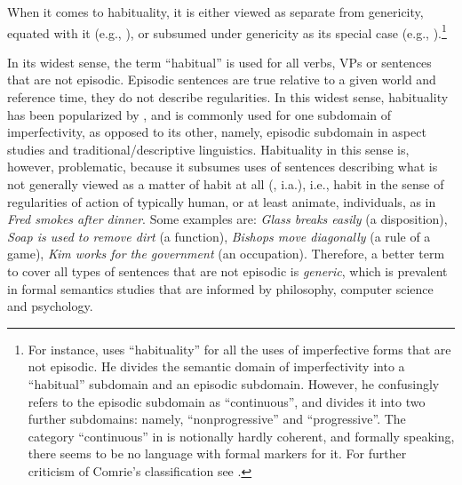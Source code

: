 \documentclass[output=paper,colorlinks,citecolor=brown]{langscibook}
\begin{document}
When it comes to habituality, it
is either viewed as separate from genericity, equated with it (e.g., \citealt{Comrie1976}), or subsumed under genericity as its special case (e.g., \citealt{krifka1995genericity}).\footnote{For instance, \citet{Comrie1976}
uses ``habituality'' for 
all the uses of imperfective forms that are not episodic.
He divides the semantic domain of imperfectivity into a
``habitual'' subdomain and an episodic subdomain. However, 
he confusingly refers to the episodic subdomain as ``continuous'',
and divides it into two further subdomains: namely, ``nonprogressive'' and ``progressive''. The category ``continuous'' in \citep{Comrie1976} is notionally hardly coherent, and 
formally speaking, there seems to be no language with formal markers for it. For further criticism of Comrie's classification see \citet{filip1997suigenva}.}

In its widest sense, the term ``habitual'' 
is used for all verbs, VPs or sentences that are not episodic.
Episodic sentences are true relative to a given world and reference time, they do not describe regularities. In this widest sense, habituality has been popularized by  \citet{Comrie1976}, 
and is commonly used for one subdomain of imperfectivity, 
as opposed to its other, namely, episodic subdomain in aspect studies and 
traditional/descriptive
linguistics. Habituality in this sense is, however, problematic, because it subsumes uses of sentences describing what is not generally viewed as a matter of habit 
at all (\citealt[716]{Lyons1977}, i.a.), i.e., habit in the sense of regularities of action of typically human, or at least animate, individuals, as in  \textit{Fred smokes after dinner}. Some examples are: \textit{Glass breaks easily} (a disposition), \textit{Soap is used to remove dirt} (a function), \textit{Bishops move diagonally} (a rule of a game),  \textit{Kim works for the government} (an occupation). Therefore, a better term to cover all types of sentences that are not episodic is \textit{generic}, which is prevalent in formal 
semantics studies that are informed by philosophy, computer science and psychology. 
\end{document}
